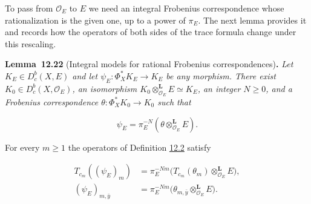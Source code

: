 \documentclass[11pt]{article}
\newenvironment{bpstatement}[2]{\par\addvspace{0.6\baselineskip}\noindent\textbf{#1}#2\textbf{.}\enspace\ignorespaces}
  {\par\addvspace{0.4\baselineskip}}
\newenvironment{bpstatementit}[2]{\begin{bpstatement}{#1}{#2}\itshape\ignorespaces}{\end{bpstatement}}
\providecommand{\Dbc}{}\renewcommand{\Dbc}{D^b_c}
\begin{document}
\label{bp293}%
To pass from \(\mathcal O_E\) to \(E\) we need an integral Frobenius correspondence whose rationalization is the given one, up to a power of \(\pi_E\). The next lemma provides it and records how the operators of both sides of the trace formula change under this rescaling.

\label{bp294}%
\begin{bpstatementit}{Lemma~12.22}{ (Integral models for rational Frobenius correspondences)}
Let \(K_E\in\Dbc(X,E)\) and let \(\psi_E:\Phi_X^*K_E\to K_E\) be any morphism. There exist \(K_0\in\Dbc(X,\mathcal O_E)\), an isomorphism \(K_0\otimes^{\mathbf L}_{\mathcal O_E}E\simeq K_E\), an integer \(N\geq0\), and a Frobenius correspondence \(\theta:\Phi_X^*K_0\to K_0\) such that

\[
\psi_E=\pi_E^{-N}(\theta\otimes^{\mathbf L}_{\mathcal O_E}E).
\]

For every \(m\geq1\) the operators of Definition \hyperref[bp232]{12.2} satisfy

\[
\begin{aligned}
T_{c_m}((\psi_E)_m)&=\pi_E^{-Nm}
\bigl(T_{c_m}(\theta_m)\otimes^{\mathbf L}_{\mathcal O_E}E\bigr),\\
(\psi_E)_{m,\bar y}&=\pi_E^{-Nm}
\bigl(\theta_{m,\bar y}\otimes^{\mathbf L}_{\mathcal O_E}E\bigr).
\end{aligned}
\tag{12.2}
\]
\end{bpstatementit}
\end{document}
